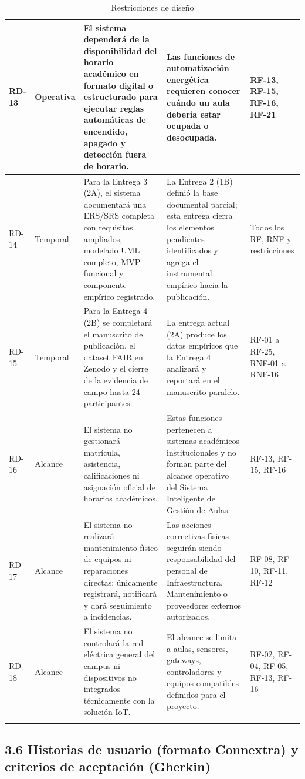 \begin{longtable}{|p{3.1cm}|p{3.1cm}|p{3.1cm}|p{3.1cm}|p{3.1cm}|}
RD-13 & Operativa & El sistema dependerá de la disponibilidad del horario académico en formato digital o estructurado para ejecutar reglas automáticas de encendido, apagado y detección fuera de horario. & Las funciones de automatización energética requieren conocer cuándo un aula debería estar ocupada o desocupada. & RF-13, RF-15, RF-16, RF-21 \\ \hline
RD-14 & Temporal & Para la Entrega 3 (2A), el sistema documentará una ERS/SRS completa con requisitos ampliados, modelado UML completo, MVP funcional y componente empírico registrado. & La Entrega 2 (1B) definió la base documental parcial; esta entrega cierra los elementos pendientes identificados y agrega el instrumental empírico hacia la publicación. & Todos los RF, RNF y restricciones \\ \hline
RD-15 & Temporal & Para la Entrega 4 (2B) se completará el manuscrito de publicación, el dataset FAIR en Zenodo y el cierre de la evidencia de campo hasta 24 participantes. & La entrega actual (2A) produce los datos empíricos que la Entrega 4 analizará y reportará en el manuscrito paralelo. & RF-01 a RF-25, RNF-01 a RNF-16 \\ \hline
RD-16 & Alcance & El sistema no gestionará matrícula, asistencia, calificaciones ni asignación oficial de horarios académicos. & Estas funciones pertenecen a sistemas académicos institucionales y no forman parte del alcance operativo del Sistema Inteligente de Gestión de Aulas. & RF-13, RF-15, RF-16 \\ \hline
RD-17 & Alcance & El sistema no realizará mantenimiento físico de equipos ni reparaciones directas; únicamente registrará, notificará y dará seguimiento a incidencias. & Las acciones correctivas físicas seguirán siendo responsabilidad del personal de Infraestructura, Mantenimiento o proveedores externos autorizados. & RF-08, RF-10, RF-11, RF-12 \\ \hline
RD-18 & Alcance & El sistema no controlará la red eléctrica general del campus ni dispositivos no integrados técnicamente con la solución IoT. & El alcance se limita a aulas, sensores, gateways, controladores y equipos compatibles definidos para el proyecto. & RF-02, RF-04, RF-05, RF-13, RF-16 \\ \hline
\caption{Restricciones de diseño}
\end{longtable}
\endgroup

\subsection*{3.6 Historias de usuario (formato Connextra) y criterios de aceptación (Gherkin)}


